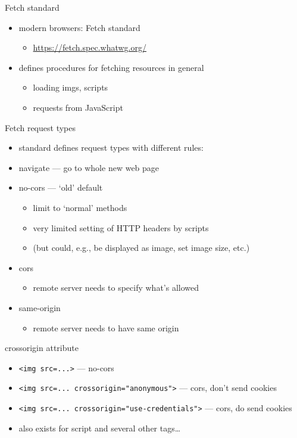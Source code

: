 \begin{frame}{Fetch standard}
    \begin{itemize}
    \item modern browsers: Fetch standard
        \begin{itemize}
        \item {\scriptsize\url{https://fetch.spec.whatwg.org/}}
        \end{itemize}
    \item defines procedures for fetching resources in general
        \begin{itemize}
        \item loading imgs, scripts
        \item requests from JavaScript
        \end{itemize}
    \end{itemize}
\end{frame}

\begin{frame}{Fetch request types}
    \begin{itemize}
    \item standard defines request types with different rules:
    \item navigate --- go to whole new web page
    \item no-cors --- `old' default
        \begin{itemize}
        \item limit to `normal' methods
        \item very limited setting of HTTP headers by scripts
        \item {} (but could, e.g., be displayed as image, set image size, etc.)
        \end{itemize}
    \item cors
        \begin{itemize}
        \item remote server needs to specify what's allowed
        \end{itemize}
    \item same-origin
        \begin{itemize}
        \item remote server needs to have same origin
        \end{itemize}
    \end{itemize}
\end{frame}

\begin{frame}[fragile]{crossorigin attribute}
    \begin{itemize}
    \item \verb|<img src=...>| --- no-cors
    \item \verb|<img src=... crossorigin="anonymous">| --- cors, don't send cookies
    \item \verb|<img src=... crossorigin="use-credentials">| --- cors, do send cookies
    \vspace{.5cm}
    \item also exists for script and several other tags\ldots
    \end{itemize}
\end{frame}

